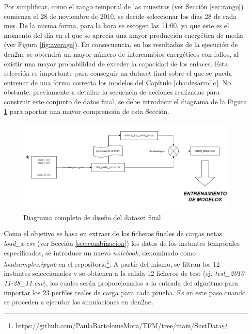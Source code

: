 Por simplificar, como el rango temporal de las muestras (ver Sección \ref{sec:rango}) comienza el 28 de noviembre de 2010, se decide seleccionar los días 28 de cada mes. De la misma forma, para la hora se escogen las 11:00, ya que este es el momento del día en el que se aprecia una mayor producción energética de media (ver Figura \ref{fig:average}). En consecuencia, en los resultados de la ejecución de \gls{den2ne} se obtendrá un mayor número de intercambios energéticos con fallos, al existir una mayor probabilidad de exceder la capacidad de los enlaces. Esta selección es importante para conseguir un dataset final sobre el que se pueda entrenar de una forma correcta los modelos del Capítulo \ref{cha:desarrollo}. No obstante, previamente a detallar la secuencia de acciones realizadas para construir este conjunto de datos final, se debe introducir el diagrama de la Figura \ref{fig:total2} para aportar una mayor comprensión de esta Sección. 

\begin{figure}[H]
    \centering
    \includegraphics[width=1\textwidth]{img/diseno/total2.png}
    \caption{Diagrama completo de diseño del dataset final}
    \label{fig:total2}
\end{figure}

\vspace{3mm}

Como el objetivo se basa en extraer de los ficheros finales de cargas netas \textit{load\_x.csv} (ver Sección \ref{sec:combinacion}) los datos de los instantes temporales especificados, se introduce un nuevo \textit{notebook}, denominado como \textit{loadsamples.ipynb} en el repositorio\footnote{https://github.com/PaulaBartolomeMora/TFM/tree/main/SustData}. A partir del mismo, se filtran los 12 instantes seleccionados y se obtienen a la salida 12 ficheros de test (ej. \textit{test\_2010-11-28\_11.csv}), los cuales serán proporcionados a la entrada del algoritmo para importar los 23 perfiles reales de carga para cada prueba. Es en este paso cuando se proceden a ejecutar las simulaciones en \gls{den2ne}. 

